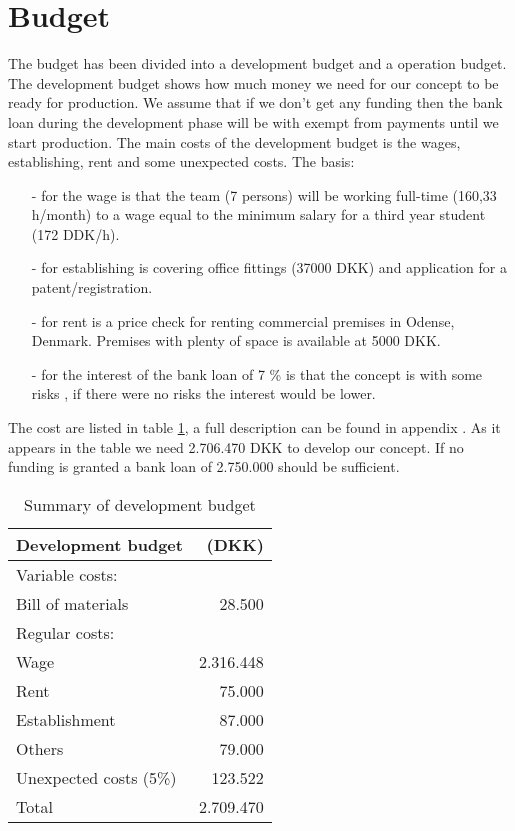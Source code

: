 \section{Budget}
\label{budget_label}
The budget has been divided into a development budget and a operation budget. The development budget  shows how much money we need for our concept to be ready for production. We assume that if we don't get any funding then the bank loan during the development phase will be with exempt from payments until we start production. The main costs of the development budget is the wages, establishing, rent and some unexpected costs. 
The basis: \begin{itemize}
\item[-] for the wage is that the team (7 persons) will be working full-time (160,33 h/month) to a wage equal to the minimum salary for a third year student (172 DDK/h\cite{ida-salary}).
\item[-] for establishing is covering office fittings (37000 DKK) and application for a patent/registration.
\item[-] for rent is a price check for renting commercial premises in Odense, Denmark. Premises with plenty of space is available at 5000 DKK.\cite{rent_prices}
\item[-] for the interest of the bank loan of 7 \% is that the concept is with some risks , if there were no risks the interest would be lower. 
\end{itemize} 
The cost are listed in table \ref{devbud}, a full description can be found in appendix . As it appears in the table we need 2.706.470 DKK to develop our concept. If no funding is granted a bank loan of 2.750.000 should be sufficient.

\begin{table}[h!]
\centering
\begin{tabular}{l r}
Development budget      & (DKK)\\
\hline                  
Variable costs:         &  \\
Bill of materials       &  28.500  \\
Regular costs:          &  \\
Wage                    &  2.316.448\\
Rent                    &  75.000\\
Establishment           &  87.000\\
Others                  &  79.000\\
Unexpected costs (5\%)  &  123.522\\
\hline                    
Total                   &  2.709.470\\
\end{tabular}
\caption{Summary of development budget}
\label{devbud}
\end{table}


